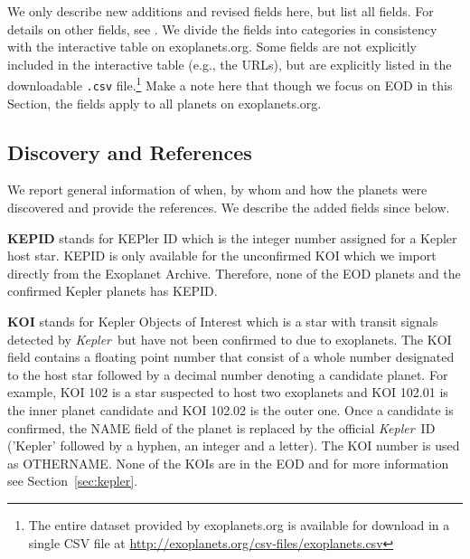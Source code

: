 \documentclass[11pt,preprint]{aastex}
\def\kepler{\textit{Kepler}}
\begin{document}
\begin{CJK*}{UTF8}{gbsn}
We only describe new additions and revised fields here, but list all
fields. For details on other fields, see \cite{Wright2011}. We divide
the fields into categories in consistency with the interactive table
on exoplanets.org. Some fields are not explicitly included in the
interactive table (e.g., the URLs), but are explicitly listed in the
downloadable {\tt .csv} file.\footnote{The entire dataset provided by
  exoplanets.org is available for download in a single CSV file at
  \url{http://exoplanets.org/csv-files/exoplanets.csv}} Make a note
here that though we focus on EOD in this Section, the fields apply to
all planets on exoplanets.org.

\subsection{Discovery and References}

We report general information of when, by whom and how the planets
were discovered and provide the references. We describe the added
fields since \cite{Wright2011} below.

{\bf KEPID} stands for KEPler ID which is the integer number assigned
for a Kepler host star. KEPID is only available for the unconfirmed
KOI which we import directly from the Exoplanet Archive. Therefore,
none of the EOD planets and the confirmed Kepler planets has KEPID.

{\bf KOI} stands for Kepler Objects of Interest which is a star with
transit signals detected by \kepler\ but have not been confirmed to
due to exoplanets. The KOI field contains a floating point number that
consist of a whole number designated to the host star followed by a
decimal number denoting a candidate planet. For example, KOI 102 is a
star suspected to host two exoplanets and KOI 102.01 is the inner
planet candidate and KOI 102.02 is the outer one. Once a candidate is
confirmed, the NAME field of the planet is replaced by the official
\kepler\ ID ('Kepler' followed by a hyphen, an integer and a
letter). The KOI number is used as OTHERNAME. None of the KOIs are in
the EOD and for more information see Section~\ref{sec:kepler}.


\end{CJK*}
\end{document}
